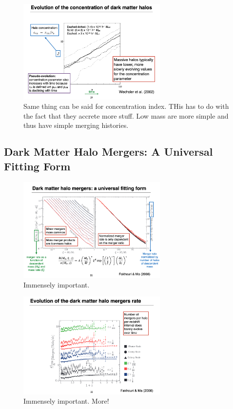 \documentclass{article}
\begin{document}
\begin{figure}
    \centering
\includegraphics[width=0.66\textwidth]{figs/Screen Shot 2021-10-13 at 10.44.54 AM.png}
    \caption{Same thing can be said for concentration index.  THis has to do with the fact that they accrete more stuff. Low mass are more simple and thus have simple merging histories.}
    \label{fig:c_parmas}
\end{figure}

\subsection{Dark Matter Halo Mergers: A Universal Fitting Form}

\begin{figure}
    \centering
\includegraphics[width=0.66\textwidth]{figs/Screen Shot 2021-10-13 at 10.47.49 AM.png}
    \caption{Immensely important. }
    \label{fig:chungpeimakesanappearance}
\end{figure}

\begin{figure}
    \centering
\includegraphics[width=0.66\textwidth]{figs/Screen Shot 2021-10-13 at 10.48.23 AM.png}
    \caption{Immensely important. More!}
    \label{fig:chungpeimakesanappearance_2}
\end{figure}
\end{document}
